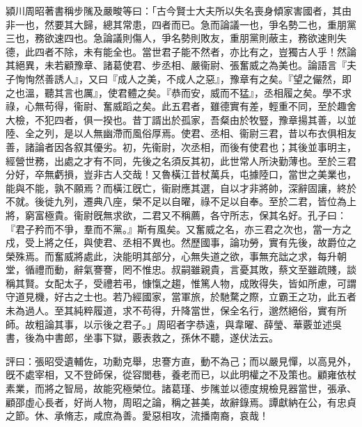 \begin{pinyinscope}
 
 潁川周昭著書稱步隲及嚴畯等曰：「古今賢士大夫所以失名喪身傾家害國者，其由非一也，然要其大歸，總其常患，四者而已。急而論議一也，爭名勢二也，重朋黨三也，務欲速四也。急論議則傷人，爭名勢則敗友，重朋黨則蔽主，務欲速則失德，此四者不除，未有能全也。當世君子能不然者，亦比有之，豈獨古人乎！然論其絕異，未若顧豫章、諸葛使君、步丞相、嚴衞尉、張奮威之為美也。論語言『夫子恂恂然善誘人』，又曰『成人之美，不成人之惡』，豫章有之矣。『望之儼然，即之也溫，聽其言也厲』，使君體之矣。『恭而安，威而不猛』，丞相履之矣。學不求祿，心無苟得，衞尉、奮威蹈之矣。此五君者，雖德實有差，輕重不同，至於趣舍大檢，不犯四者，俱一揆也。昔丁諝出於孤家，吾粲由於牧豎，豫章揚其善，以並陸、全之列，是以人無幽滯而風俗厚焉。使君、丞相、衞尉三君，昔以布衣俱相友善，諸論者因各叙其優劣。初，先衞尉，次丞相，而後有使君也；其後並事明主，經營世務，出處之才有不同，先後之名須反其初，此世常人所決勤薄也。至於三君分好，卒無虧損，豈非古人交哉！又魯橫江昔杖萬兵，屯據陸口，當世之美業也，能與不能，孰不願焉？而橫江旣亡，衞尉應其選，自以才非將帥，深辭固讓，終於不就。後徙九列，遷典八座，榮不足以自曜，祿不足以自奉。至於二君，皆位為上將，窮富極貴。衞尉旣無求欲，二君又不稱薦，各守所志，保其名好。孔子曰：『君子矜而不爭，羣而不黨。』斯有風矣。又奮威之名，亦三君之次也，當一方之戍，受上將之任，與使君、丞相不異也。然歷國事，論功勞，實有先後，故爵位之榮殊焉。而奮威將處此，決能明其部分，心無失道之欲，事無充詘之求，每升朝堂，循禮而動，辭氣謇謇，罔不惟忠。叔嗣雖親貴，言憂其敗，蔡文至雖疏賤，談稱其賢。女配太子，受禮若弔，慷愾之趨，惟篤人物，成敗得失，皆如所慮，可謂守道見機，好古之士也。若乃經國家，當軍旅，於馳騖之際，立霸王之功，此五者未為過人。至其純粹履道，求不苟得，升降當世，保全名行，邈然絕俗，實有所師。故粗論其事，以示後之君子。」周昭者字恭遠，與韋曜、薛瑩、華覈並述吳書，後為中書郎，坐事下獄，覈表救之，孫休不聽，遂伏法云。
 
 
 
 
 評曰：張昭受遺輔佐，功勳克舉，忠謇方直，動不為己；而以嚴見憚，以高見外，旣不處宰相，又不登師保，從容閭巷，養老而已，以此明權之不及策也。顧雍依杖素業，而將之智局，故能究極榮位。諸葛瑾、步隲並以德度規檢見器當世，張承、顧邵虛心長者，好尚人物，周昭之論，稱之甚美，故辭錄焉。譚獻納在公，有忠貞之節。休、承脩志，咸庶為善。愛惡相攻，流播南裔，哀哉！
 
 
\end{pinyinscope}